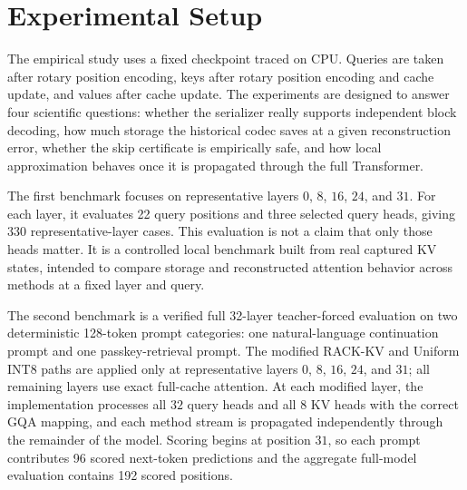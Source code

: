 \section{Experimental Setup}

The empirical study uses a fixed \modeldisplay{} checkpoint traced on CPU. Queries are taken after rotary position encoding, keys after rotary position encoding and cache update, and values after cache update. The experiments are designed to answer four scientific questions: whether the serializer really supports independent block decoding, how much storage the historical codec saves at a given reconstruction error, whether the skip certificate is empirically safe, and how local approximation behaves once it is propagated through the full Transformer.

\begin{table}[t]
  \centering
  \small
  
  \caption{Primary experimental configuration reported in the main paper. Exact revision identifiers, software versions, and build details are kept in the reproducibility materials rather than the main narrative.}
  \label{tab:config}
\end{table}

The first benchmark focuses on representative layers \(0\), \(8\), \(16\), \(24\), and \(31\). For each layer, it evaluates \num{22} query positions and three selected query heads, giving \num{330} representative-layer cases. This evaluation is not a claim that only those heads matter. It is a controlled local benchmark built from real captured KV states, intended to compare storage and reconstructed attention behavior across methods at a fixed layer and query.

The second benchmark is a verified full 32-layer teacher-forced evaluation on two deterministic 128-token prompt categories: one natural-language continuation prompt and one passkey-retrieval prompt. The modified RACK-KV and Uniform INT8 paths are applied only at representative layers \(0\), \(8\), \(16\), \(24\), and \(31\); all remaining layers use exact full-cache attention. At each modified layer, the implementation processes all \(32\) query heads and all \(8\) KV heads with the correct GQA mapping, and each method stream is propagated independently through the remainder of the model. Scoring begins at position \(31\), so each prompt contributes \num{96} scored next-token predictions and the aggregate full-model evaluation contains \num{192} scored positions.

